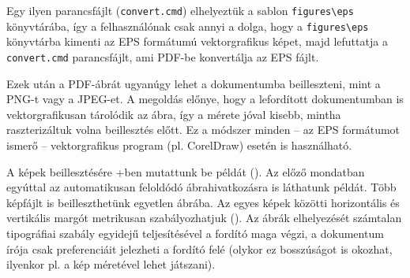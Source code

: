 Egy ilyen parancsfájlt (\verb+convert.cmd+) elhelyeztük a sablon \verb+figures\eps+ könyvtárába, így a felhasználónak csak annyi a dolga, hogy a \verb+figures\eps+ könyvtárba kimenti az EPS formátumú vektorgrafikus képet, majd lefuttatja a \verb+convert.cmd+ parancsfájlt, ami PDF-be konvertálja az EPS fájlt.

Ezek után a PDF-ábrát ugyanúgy lehet a dokumentumba beilleszteni, mint a PNG-t vagy a JPEG-et. A megoldás előnye, hogy a lefordított dokumentumban is vektorgrafikusan tárolódik az ábra, így a mérete jóval kisebb, mintha raszterizáltuk volna beillesztés előtt. Ez a módszer minden -- az EPS formátumot ismerő -- vektorgrafikus program (pl. CorelDraw) esetén is használható.

A képek beillesztésére \az+ben mutattunk be példát (). Az előző mondatban egyúttal az automatikusan feloldódó ábrahivatkozásra is láthatunk példát. Több képfájlt is beilleszthetünk egyetlen ábrába. Az egyes képek közötti horizontális és vertikális margót metrikusan szabályozhatjuk (). Az ábrák elhelyezését számtalan tipográfiai szabály egyidejű teljesítésével a fordító maga végzi, a dokumentum írója csak preferenciáit jelezheti a fordító felé (olykor ez bosszúságot is okozhat, ilyenkor pl. a kép méretével lehet játszani).

